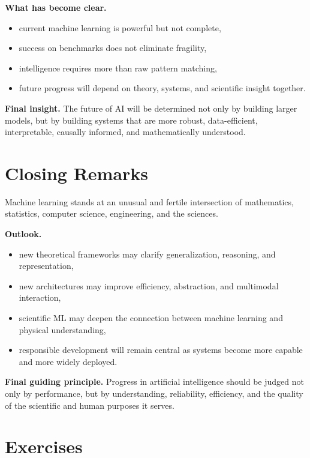 \medskip

\noindent
\textbf{What has become clear.}
\begin{itemize}
    \item current machine learning is powerful but not complete,
    \item success on benchmarks does not eliminate fragility,
    \item intelligence requires more than raw pattern matching,
    \item future progress will depend on theory, systems, and scientific insight together.
\end{itemize}

\medskip

\noindent
\textbf{Final insight.}
The future of AI will be determined not only by building larger models, but by building systems that are more robust, data-efficient, interpretable, causally informed, and mathematically understood.

\section{Closing Remarks}

Machine learning stands at an unusual and fertile intersection of mathematics, statistics, computer science, engineering, and the sciences.

\medskip

\noindent
\textbf{Outlook.}
\begin{itemize}
    \item new theoretical frameworks may clarify generalization, reasoning, and representation,
    \item new architectures may improve efficiency, abstraction, and multimodal interaction,
    \item scientific ML may deepen the connection between machine learning and physical understanding,
    \item responsible development will remain central as systems become more capable and more widely deployed.
\end{itemize}

\medskip

\noindent
\textbf{Final guiding principle.}
Progress in artificial intelligence should be judged not only by performance, but by understanding, reliability, efficiency, and the quality of the scientific and human purposes it serves.

\section*{Exercises}

